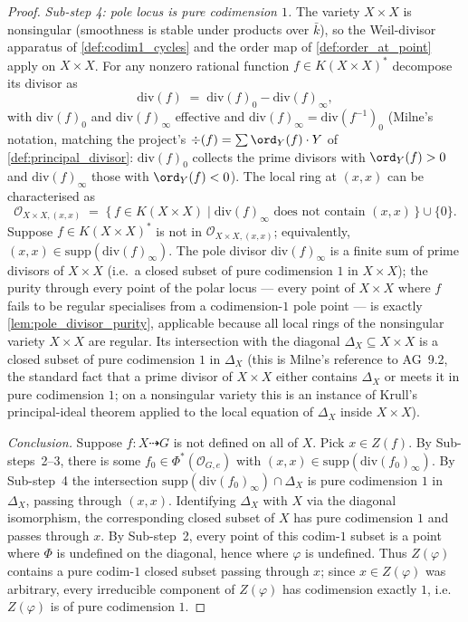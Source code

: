 \begin{proof}
  \emph{Sub-step 4: pole locus is pure codimension \(1\).} The variety \(X \times X\) is
  nonsingular (smoothness is stable under products over \(\bar k\)), so the Weil-divisor
  apparatus of \cref{def:codim1_cycles} and the order map of
  \cref{def:order_at_point} apply on \(X \times X\). For any nonzero rational function
  \(f \in K(X \times X)^\ast\) decompose its divisor as
  \[
    \mathrm{div}(f) \;=\; \mathrm{div}(f)_0 - \mathrm{div}(f)_\infty,
  \]
  with \(\mathrm{div}(f)_0\) and \(\mathrm{div}(f)_\infty\) effective and
  \(\mathrm{div}(f)_\infty = \mathrm{div}(f^{-1})_0\) (Milne's notation, matching the
  project's \(\div(f) = \sum \ord_Y(f) \cdot Y\) of
  \cref{def:principal_divisor}: \(\mathrm{div}(f)_0\) collects the prime divisors with
  \(\ord_Y(f) > 0\) and \(\mathrm{div}(f)_\infty\) those with \(\ord_Y(f) < 0\)). The local
  ring at \((x, x)\) can be characterised as
  \[
    \mathcal O_{X \times X, (x, x)}
    \;=\; \bigl\{\, f \in K(X \times X) \;\big|\;
    \mathrm{div}(f)_\infty \text{ does not contain } (x, x) \,\bigr\} \cup \{0\}.
  \]
  Suppose \(f \in K(X \times X)^\ast\) is not in \(\mathcal O_{X \times X, (x, x)}\);
  equivalently, \((x, x) \in \mathrm{supp}(\mathrm{div}(f)_\infty)\). The pole divisor
  \(\mathrm{div}(f)_\infty\) is a finite sum of prime divisors of \(X \times X\) (i.e.\ a
  closed subset of pure codimension \(1\) in \(X \times X\)); the purity through every
  point of the polar locus --- every point of \(X \times X\) where \(f\) fails to be
  regular specialises from a codimension-\(1\) pole point --- is exactly
  \cref{lem:pole_divisor_purity}, applicable because all local rings of the
  nonsingular variety \(X \times X\) are regular. Its intersection with the
  diagonal \(\Delta_X \subseteq X \times X\) is a closed subset of pure codimension \(1\)
  in \(\Delta_X\) (this is Milne's reference to AG~9.2, the standard fact that a prime
  divisor of \(X \times X\) either contains \(\Delta_X\) or meets it in pure codimension
  \(1\); on a nonsingular variety this is an instance of Krull's principal-ideal theorem
  applied to the local equation of \(\Delta_X\) inside \(X \times X\)).

  \emph{Conclusion.} Suppose \(f \colon X \dashrightarrow G\) is not defined on all of
  \(X\). Pick \(x \in Z(f)\). By Sub-steps~2--3, there is some \(f_0 \in
  \Phi^\ast(\mathcal O_{G, e})\) with \((x, x) \in \mathrm{supp}(\mathrm{div}(f_0)_\infty)\).
  By Sub-step~4 the intersection \(\mathrm{supp}(\mathrm{div}(f_0)_\infty) \cap
  \Delta_X\) is pure codimension \(1\) in \(\Delta_X\), passing through \((x, x)\).
  Identifying \(\Delta_X\) with \(X\) via the diagonal isomorphism, the corresponding
  closed subset of \(X\) has pure codimension \(1\) and passes through \(x\). By Sub-step~2,
  every point of this codim-\(1\) subset is a point where \(\Phi\) is undefined on the
  diagonal, hence where \(\varphi\) is undefined. Thus \(Z(\varphi)\) contains a pure
  codim-\(1\) closed subset passing through \(x\); since \(x \in Z(\varphi)\) was arbitrary,
  every irreducible component of \(Z(\varphi)\) has codimension exactly \(1\), i.e.\
  \(Z(\varphi)\) is of pure codimension \(1\).
\end{proof}

